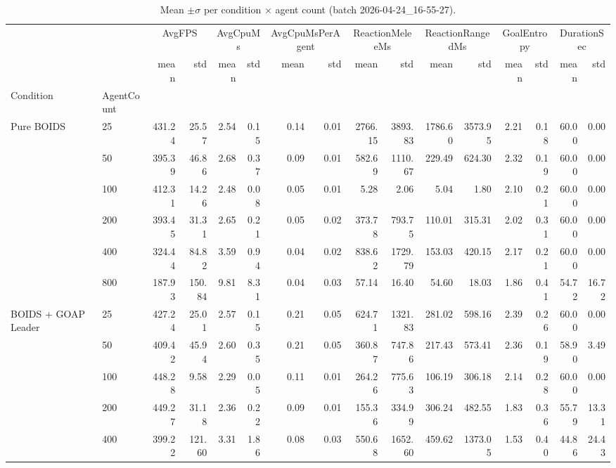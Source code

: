 \begin{table}[htbp]
  \centering
  \caption{Mean $\pm\sigma$ per condition $\times$ agent count (batch 2026-04-24_16-55-27).}
  \label{tab:summary-mean-sigma}
\begin{tabular}{llrrrrrrrrrrrrrr}
\toprule
 &  & \multicolumn{2}{c}{AvgFPS} & \multicolumn{2}{c}{AvgCpuMs} & \multicolumn{2}{c}{AvgCpuMsPerAgent} & \multicolumn{2}{c}{ReactionMeleeMs} & \multicolumn{2}{c}{ReactionRangedMs} & \multicolumn{2}{c}{GoalEntropy} & \multicolumn{2}{c}{DurationSec} \\
 &  & mean & std & mean & std & mean & std & mean & std & mean & std & mean & std & mean & std \\
Condition & AgentCount &  &  &  &  &  &  &  &  &  &  &  &  &  &  \\
\midrule
\multirow[t]{6}{*}{Pure BOIDS} & 25 & 431.24 & 25.57 & 2.54 & 0.15 & 0.14 & 0.01 & 2766.15 & 3893.83 & 1786.60 & 3573.95 & 2.21 & 0.18 & 60.00 & 0.00 \\
 & 50 & 395.39 & 46.86 & 2.68 & 0.37 & 0.09 & 0.01 & 582.69 & 1110.67 & 229.49 & 624.30 & 2.32 & 0.19 & 60.00 & 0.00 \\
 & 100 & 412.31 & 14.26 & 2.48 & 0.08 & 0.05 & 0.01 & 5.28 & 2.06 & 5.04 & 1.80 & 2.10 & 0.21 & 60.00 & 0.00 \\
 & 200 & 393.45 & 31.31 & 2.65 & 0.21 & 0.05 & 0.02 & 373.78 & 793.75 & 110.01 & 315.31 & 2.02 & 0.31 & 60.00 & 0.00 \\
 & 400 & 324.44 & 84.82 & 3.59 & 0.94 & 0.04 & 0.02 & 838.62 & 1729.79 & 153.03 & 420.15 & 2.17 & 0.21 & 60.00 & 0.00 \\
 & 800 & 187.93 & 150.84 & 9.81 & 8.31 & 0.04 & 0.03 & 57.14 & 16.40 & 54.60 & 18.03 & 1.86 & 0.41 & 54.72 & 16.72 \\
\cline{1-16}
\multirow[t]{6}{*}{BOIDS + GOAP Leader} & 25 & 427.24 & 25.01 & 2.57 & 0.15 & 0.21 & 0.05 & 624.71 & 1321.83 & 281.02 & 598.16 & 2.39 & 0.26 & 60.00 & 0.00 \\
 & 50 & 409.42 & 45.94 & 2.60 & 0.35 & 0.21 & 0.05 & 360.87 & 747.86 & 217.43 & 573.41 & 2.36 & 0.19 & 58.90 & 3.49 \\
 & 100 & 448.28 & 9.58 & 2.29 & 0.05 & 0.11 & 0.01 & 264.26 & 775.63 & 106.19 & 306.18 & 2.14 & 0.28 & 60.00 & 0.00 \\
 & 200 & 449.27 & 31.18 & 2.36 & 0.22 & 0.09 & 0.01 & 155.36 & 334.99 & 306.24 & 482.55 & 1.83 & 0.36 & 55.79 & 13.31 \\
 & 400 & 399.22 & 121.60 & 3.31 & 1.86 & 0.08 & 0.03 & 550.68 & 1652.60 & 459.62 & 1373.05 & 1.53 & 0.40 & 44.86 & 24.43 \\

\end{tabular}
\end{table}
